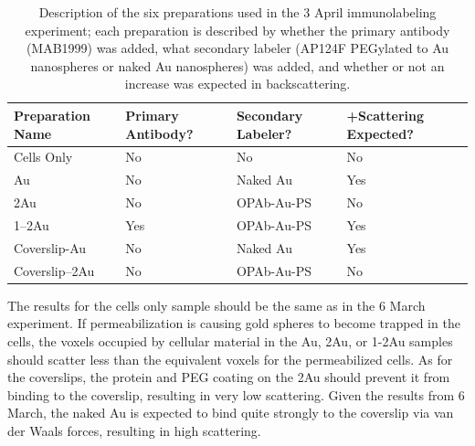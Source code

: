 \begin{table}[htb]
\caption{Description of the six preparations used in the 3 April immunolabeling experiment; each preparation is described by whether the primary antibody (MAB1999) was added, what secondary labeler (AP124F PEGylated to Au nanospheres or naked Au nanospheres) was added, and whether or not an increase was expected in backscattering.}
\begin{minipage}{\linewidth}
\setlength{\tymax}{0.5\linewidth}
\centering
\small
\begin{tabular}{lp{2cm}p{2cm}p{2cm}} \toprule
Preparation Name&Primary Antibody?&Secondary Labeler?&+Scattering Expected?\\
\midrule
Cells Only&No&No&No\\
Au&No&Naked Au&Yes\\
2Au&No&OPAb-Au-PS&No\\
1--2Au&Yes&OPAb-Au-PS&Yes\\
Coverslip-Au&No&Naked Au&Yes\\
Coverslip--2Au&No&OPAb-Au-PS&No\\

\bottomrule

\end{tabular}
\end{minipage}
\label{tab:3AprilPrepTable}
\end{table}

The results for the cells only sample should be the same as in the 6 March experiment. If permeabilization is causing gold spheres to become trapped in the cells, the voxels occupied by cellular material in the Au, 2Au, or 1-2Au samples should scatter less than the equivalent voxels for the permeabilized cells. As for the coverslips, the protein and PEG coating on the 2Au should prevent it from binding to the coverslip, resulting in very low scattering. Given the results from 6 March, the naked Au is expected to bind quite strongly to the coverslip via van der Waals forces, resulting in high scattering.

